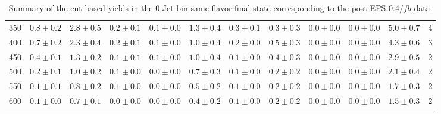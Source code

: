 \begin{table}[!hb]
{\begin{center}
\begin{tabular}{l c c c c c c c c c c c }
350 & $0.8\pm0.2$ & $2.8\pm0.5$ & $0.2\pm0.1$ & $0.1\pm0.0$ & $1.3\pm0.4$ & $0.3\pm0.1$ & $0.3\pm0.3$ & $0.0\pm0.0$ & $0.0\pm0.0$ & $5.0\pm0.7$ & 4 \\
400 & $0.7\pm0.2$ & $2.3\pm0.4$ & $0.2\pm0.1$ & $0.1\pm0.0$ & $1.0\pm0.4$ & $0.2\pm0.0$ & $0.5\pm0.3$ & $0.0\pm0.0$ & $0.0\pm0.0$ & $4.3\pm0.6$ & 3 \\
450 & $0.4\pm0.1$ & $1.3\pm0.2$ & $0.1\pm0.1$ & $0.1\pm0.0$ & $1.0\pm0.4$ & $0.1\pm0.0$ & $0.4\pm0.3$ & $0.0\pm0.0$ & $0.0\pm0.0$ & $2.9\pm0.5$ & 2 \\
500 & $0.2\pm0.1$ & $1.0\pm0.2$ & $0.1\pm0.0$ & $0.0\pm0.0$ & $0.7\pm0.3$ & $0.1\pm0.0$ & $0.2\pm0.2$ & $0.0\pm0.0$ & $0.0\pm0.0$ & $2.1\pm0.4$ & 2 \\
550 & $0.1\pm0.1$ & $0.8\pm0.2$ & $0.1\pm0.0$ & $0.0\pm0.0$ & $0.5\pm0.2$ & $0.1\pm0.0$ & $0.2\pm0.2$ & $0.0\pm0.0$ & $0.0\pm0.0$ & $1.7\pm0.3$ & 2 \\
600 & $0.1\pm0.0$ & $0.7\pm0.1$ & $0.0\pm0.0$ & $0.0\pm0.0$ & $0.4\pm0.2$ & $0.1\pm0.0$ & $0.2\pm0.2$ & $0.0\pm0.0$ & $0.0\pm0.0$ & $1.5\pm0.3$ & 2 \\
\hline
\end{tabular}
\end{center}
}
\caption{Summary of the cut-based yields in the 0-Jet bin same flavor final state corresponding to the post-EPS 0.4$/fb$ data.}
\end{table}
